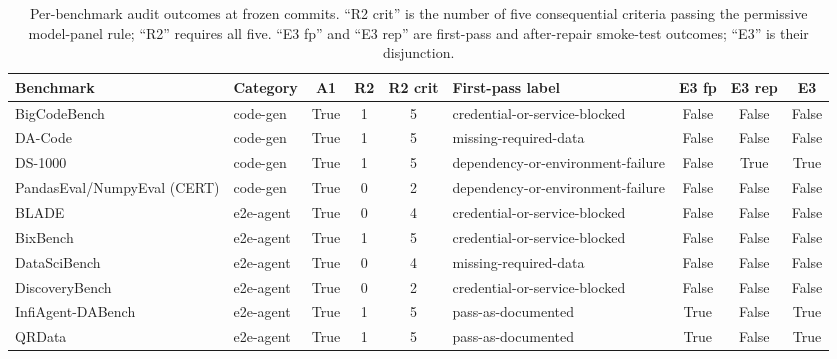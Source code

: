 \begin{table}[t]
\centering
\caption{Per-benchmark audit outcomes at frozen commits. ``R2 crit'' is the
number of five consequential criteria passing the permissive model-panel rule;
``R2'' requires all five. ``E3 fp'' and ``E3 rep'' are first-pass and
after-repair smoke-test outcomes; ``E3'' is their disjunction.}
\label{tab:perbench}

\scriptsize
\setlength{\tabcolsep}{1.25pt}
\renewcommand{\arraystretch}{1.08}

\begin{tabular}{@{}p{2.0cm}p{0.95cm}cccp{1.70cm}ccc@{}}
\toprule
Benchmark &
Category &
A1 &
R2 &
R2 crit &
First-pass label &
E3 fp &
E3 rep &
E3 \\
\midrule

BigCodeBench
& code-gen
& True & 1 & 5
& credential-or-service-blocked
& False & False & False \\

DA-Code
& code-gen
& True & 1 & 5
& missing-required-data
& False & False & False \\

DS-1000
& code-gen
& True & 1 & 5
& dependency-or-environment-failure
& False & True & True \\

PandasEval/Numpy\newline Eval (CERT)
& code-gen
& True & 0 & 2
& dependency-or-environment-failure
& False & False & False \\

BLADE
& e2e-agent
& True & 0 & 4
& credential-or-service-blocked
& False & False & False \\

BixBench
& e2e-agent
& True & 1 & 5
& credential-or-service-blocked
& False & False & False \\

DataSciBench
& e2e-agent
& True & 0 & 4
& missing-required-data
& False & False & False \\

DiscoveryBench
& e2e-agent
& True & 0 & 2
& credential-or-service-blocked
& False & False & False \\

InfiAgent-DABench
& e2e-agent
& True & 1 & 5
& pass-as-documented
& True & False & True \\

QRData
& e2e-agent
& True & 1 & 5
& pass-as-documented
& True & False & True \\


\end{tabular}
\end{table}
